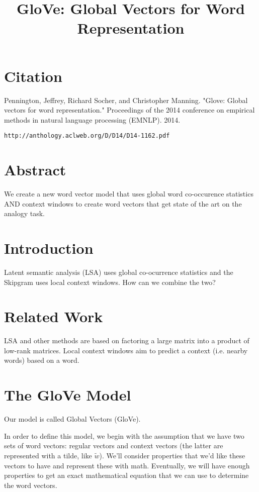 \documentclass[a4paper]{article}
\title{GloVe: Global Vectors for Word Representation}
\date{}
\begin{document}
\maketitle

\section{Citation}
Pennington, Jeffrey, Richard Socher, and Christopher Manning. "Glove: Global vectors for word representation." Proceedings of the 2014 conference on empirical methods in natural language processing (EMNLP). 2014.

\begin{verbatim}
http://anthology.aclweb.org/D/D14/D14-1162.pdf
\end{verbatim}

\section{Abstract}
We create a new word vector model that uses global word co-occurence statistics
AND context windows to create word vectors that get state of the art on the
analogy task.

\section{Introduction}
Latent semantic analysis (LSA) uses global co-ocurrence statistics and the
Skipgram uses local context windows. How can we combine the two?

\section{Related Work}
LSA and other methods are based on factoring a large matrix into a product of
low-rank matrices. Local context windows aim to predict a context (i.e. nearby
words) based on a word.

\section{The GloVe Model}
Our model is called Global Vectors (GloVe).

In order to define this model, we begin with the assumption that we have two
sets of word vectors: regular vectors and context vectors (the latter are
represented with a tilde, like $\tilde{w}$). We'll consider properties that
we'd like these vectors to have and represent these with math. Eventually,
we will have enough properties to get an exact mathematical equation that
we can use to determine the word vectors.
\end{document}
